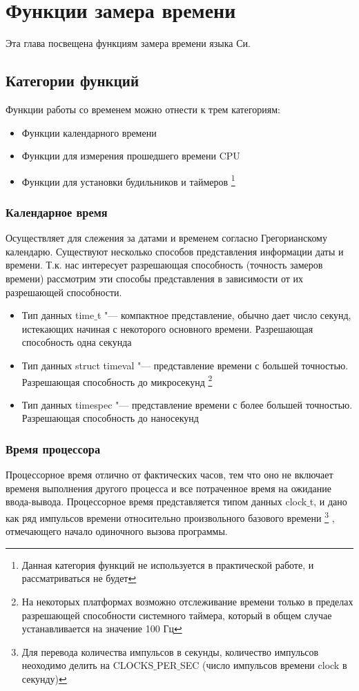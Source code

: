 \documentclass{article}
\begin{document}
	\section{Функции замера времени}
		Эта глава посвещена функциям замера времени языка Си.
		\subsection{Категории функций}	
			Функции работы со временем можно отнести к трем категориям:
			\begin{itemize} 
				\item Функции календарного времени 
				\item Функции для измерения прошедшего времени CPU
				\item Функции для установки будильников и таймеров
					\footnote{Данная категория функций не используется в практической работе, и рассматриваться не будет}
			\end{itemize}
			\subsubsection{Календарное время}
				 Осуществляет для слежения за датами и временем согласно Грегорианскому календарю. Существуют несколько способов 				представления информации даты и времени. Т.к. нас интересует разрешающая способность (точность замеров времени) 					рассмотрим эти способы представления в зависимости от их разрешающей способности.
			\begin{itemize} 
				\item Тип данных time$\_$t "---  компактное представление, обычно дает число секунд, истекающих начиная с 								некоторого основного времени. Разрешающая способность одна секунда
				\item Тип данных struct timeval "--- представление времени с большей точностью. Разрешающая способность до 								микросекунд
					\footnote{На некоторых платформах возможно отслеживание времени только в пределах разрешающей способности 							системного таймера, который в общем случае устанавливается на значение 100 Гц}
				\item Тип данных timespec  "--- представление времени с более большей точностью. Разрешающая способность до 							наносекунд
			\end{itemize}	 
			\subsubsection{Время процессора}
				Процессорное время отлично от фактических часов, тем что оно не включает временя выполнения другого процесса и 					все потраченное время на ожидание ввода-вывода. Процессорное время представляется типом данных clock$\_$t, и дано 					как ряд импульсов времени относительно произвольного базового времени
			\footnote{Для перевода количества импульсов в секунды, количество импульсов неоходимо делить на CLOCKS$\_$PER$\_$SEC 				(число	импульсов времени clock в секунду)}
			, отмечающего начало одиночного вызова программы. 
				
\end{document}
